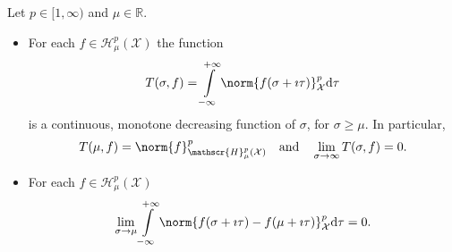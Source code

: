 \begin{proposition}
\label{prop:properties_hardy}
Let $p\in [1,\infty)$ and $\mu \in \mathbb{R}$. 
\begin{itemize}
\item[(i)]
For each $f \in \mathscr{H}^{p}_\mu(\mathcal{X})$ the function 
\begin{equation}
	T(\sigma,f)
	= 
	\int\limits_{-\infty}^{+\infty}
	\norm{
		f(\sigma+\imath \tau)
	}^p_\mathcal{X}
	\normalfont\text{d}
	\tau
\end{equation}
is a continuous, monotone decreasing function of $\sigma$,
for $\sigma \geq \mu$. 
In particular, 
\begin{equation}
    T(\mu,f) = \norm{f}^p_{\mathscr{H}^{p}_\mu(\mathcal{X})}
    \quad
    \text{and}
    \quad
    \displaystyle\lim_{\sigma \rightarrow \infty} T(\sigma,f)  = 0.
\end{equation}  

\item[(ii)]
For each $f \in \mathscr{H}^{p}_\mu(\mathcal{X})$
\begin{equation}
	\lim_{\sigma \rightarrow \mu}
	\int\limits_{-\infty}^{+\infty}
	\norm{
		f(\sigma+\imath \tau)
		-
		f(\mu+\imath \tau)
	}^p_\mathcal{X}
	\normalfont\text{d}
	\tau
	= 0.
\end{equation}
\end{itemize}
\end{proposition}



